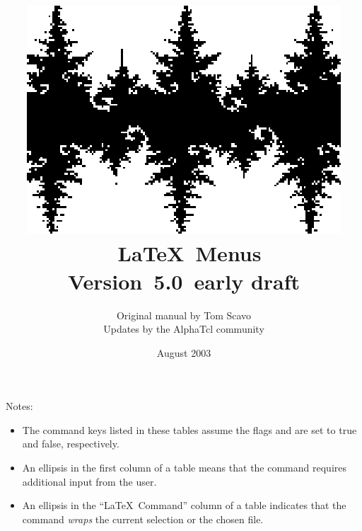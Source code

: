 \documentclass[titlepage]{article}
\begin{document}
\title{
	\includegraphics{logo.eps}  \\[6ex]
	\Alpha\ \LaTeX\ Menus \\
        {\large Version~5.0~early draft}
}
\author{
Original manual by Tom Scavo \\
Updates by the AlphaTcl community
}
\date{August 2003}
\maketitle

\vspace*{0.5in}
\listoftables
\vspace*{0.5in}
\noindent
\begin{center}
	\begin{minipage}[t]{5in}
		Notes:
		\begin{itemize}
			\item The command keys listed in these tables assume the flags 
			 and  are set to true 
			and false, respectively.
		
			\item  An ellipsis in the first column of a table means that the
			command requires additional input from the user.
		
			\item  An ellipsis in the ``\LaTeX\ Command'' column of a table 
			indicates that the command \emph{wraps} the current selection or 
			the chosen file.
		\end{itemize}
	\end{minipage}
\end{center}
\pagebreak
\end{document}
